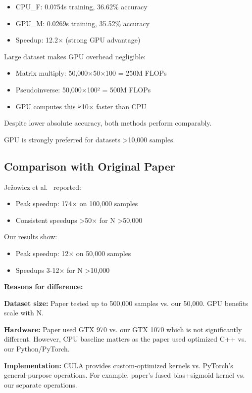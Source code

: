 \documentclass[conference]{IEEEtran}
\begin{document}
\begin{itemize}
\item CPU\_F: 0.0754s training, 36.62\% accuracy
\item GPU\_M: 0.0269s training, 35.52\% accuracy
\item Speedup: 12.2× (strong GPU advantage)
\end{itemize}

Large dataset makes GPU overhead negligible:
\begin{itemize}
\item Matrix multiply: 50,000×50×100 = 250M FLOPs
\item Pseudoinverse: 50,000×100² = 500M FLOPs
\item GPU computes this ≈10× faster than CPU
\end{itemize}

Despite lower absolute accuracy, both methods perform comparably.

GPU is strongly preferred for datasets \textgreater 10,000 samples.

\subsection{Comparison with Original Paper}

Ježowicz et al.~\cite{jezowicz2015gpu} reported:
\begin{itemize}
\item Peak speedup: 174× on 100,000 samples
\item Consistent speedups \textgreater 50× for N \textgreater 50,000
\end{itemize}

Our results show:
\begin{itemize}
\item Peak speedup: 12× on 50,000 samples
\item Speedups 3-12× for N \textgreater 10,000
\end{itemize}

\textbf{Reasons for difference:}

\textbf{Dataset size:} Paper tested up to 500,000 samples vs. our 50,000. GPU benefits scale with N.

\textbf{Hardware:} Paper used GTX 970 vs. our GTX 1070 which is not significantly different. However, CPU baseline matters as the paper used optimized C++ vs. our Python/PyTorch.

\textbf{Implementation:} CULA provides custom-optimized kernels vs. PyTorch's general-purpose operations. For example, paper's fused bias+sigmoid kernel vs. our separate operations.
\end{document}
